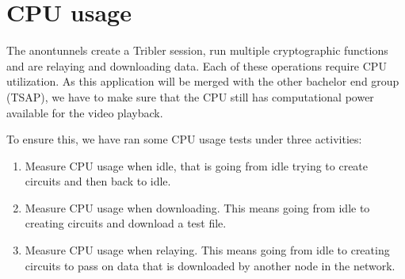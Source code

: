 \section{CPU usage}
	The anontunnels create a Tribler session, run multiple cryptographic functions and are relaying and downloading data. Each of these operations require CPU utilization. As this application will be merged with the other bachelor end group (TSAP), we have to make sure that the CPU still has computational power available for the video playback.
	
	To ensure this, we have ran some CPU usage tests under three activities:
	
	\begin{enumerate}
		\item Measure CPU usage when idle, that is going from idle trying to create circuits and then back to idle.
		\item Measure CPU usage when downloading. This means going from idle to creating circuits and download a test file.
		\item Measure CPU usage when relaying. This means going from idle to creating circuits to pass on data that is downloaded by another node in the network.
	\end{enumerate}